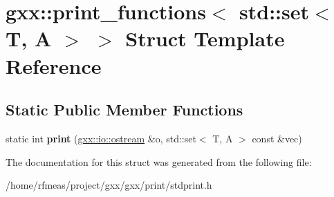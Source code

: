 \hypertarget{structgxx_1_1print__functions_3_01std_1_1set_3_01T_00_01A_01_4_01_4}{}\section{gxx\+:\+:print\+\_\+functions$<$ std\+:\+:set$<$ T, A $>$ $>$ Struct Template Reference}
\label{structgxx_1_1print__functions_3_01std_1_1set_3_01T_00_01A_01_4_01_4}
\subsection*{Static Public Member Functions}
\begin{DoxyCompactItemize}
\item 
static int {\bfseries print} (\hyperlink{classgxx_1_1io_1_1ostream}{gxx\+::io\+::ostream} \&o, std\+::set$<$ T, A $>$ const \&vec)\hypertarget{structgxx_1_1print__functions_3_01std_1_1set_3_01T_00_01A_01_4_01_4_a35db2157e8168f184cbba113eeb2e40a}{}\label{structgxx_1_1print__functions_3_01std_1_1set_3_01T_00_01A_01_4_01_4_a35db2157e8168f184cbba113eeb2e40a}

\end{DoxyCompactItemize}


The documentation for this struct was generated from the following file\+:\begin{DoxyCompactItemize}
\item 
/home/rfmeas/project/gxx/gxx/print/stdprint.\+h\end{DoxyCompactItemize}
